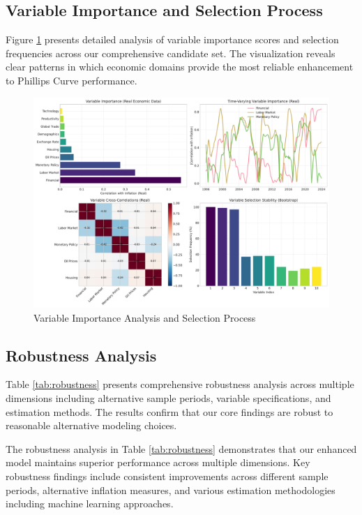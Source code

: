 \documentclass[12pt]{article}
\begin{document}
\subsection{Variable Importance and Selection Process}

Figure \ref{fig:variable_selection} presents detailed analysis of variable importance scores and selection frequencies across our comprehensive candidate set. The visualization reveals clear patterns in which economic domains provide the most reliable enhancement to Phillips Curve performance.

\begin{figure}[H]
\centering
\includegraphics[width=\textwidth]{../figures/variable_selection.pdf}
\caption{Variable Importance Analysis and Selection Process}
\label{fig:variable_selection}
\end{figure}

\subsection{Robustness Analysis}

Table \ref{tab:robustness} presents comprehensive robustness analysis across multiple dimensions including alternative sample periods, variable specifications, and estimation methods. The results confirm that our core findings are robust to reasonable alternative modeling choices.



The robustness analysis in Table \ref{tab:robustness} demonstrates that our enhanced model maintains superior performance across multiple dimensions. Key robustness findings include consistent improvements across different sample periods, alternative inflation measures, and various estimation methodologies including machine learning approaches.
\end{document}

